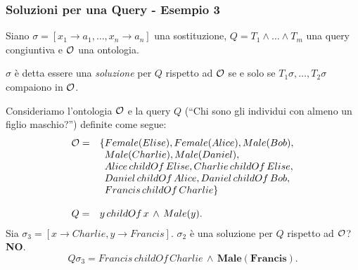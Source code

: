 \documentclass[8pt]{beamer}
\begin{document}
\begin{frame}
\frametitle{Soluzioni per una Query - Esempio 3}
Siano $\sigma=[x_1 \rightarrow a_1, \ldots, x_n \rightarrow a_n]$ una sostituzione,
$Q=T_1 \wedge \ldots \wedge T_m$ una query congiuntiva e $\mathcal{O}$ una ontologia.
\vspace{\baselineskip}

$\sigma$ \`e detta essere una \emph{soluzione} per $Q$ rispetto ad $\mathcal{O}$ se
e solo se $T_1\sigma, \ldots, T_2\sigma$ compaiono in $\mathcal{O}$. 
\vspace{\baselineskip}

Consideriamo l'ontologia $\mathcal{O}$ e la query $Q$ (``Chi sono gli individui con almeno un figlio maschio?'') definite come segue:
\[
\begin{array}{cl}
  \Ont  =  &  \{Female(Elise), Female(Alice), Male(Bob), \\
  &\phantom{\{}Male(Charlie), Male(Daniel), \\
  &\phantom{\{}Alice\,childOf\,Elise, Charlie\,childOf\,Elise, \\
  &\phantom{\{}Daniel\,childOf\,Alice, Daniel\,childOf\,Bob, \\
  &\phantom{\{}Francis\,childOf\,Charlie \}\\
  &\\
  Q = & y\,childOf\,x\,\wedge\,Male(y) .
 \end{array}
\]
Sia $\sigma_3=[x \rightarrow Charlie, y \rightarrow Francis]$. $\sigma_2$ \`e una soluzione per $Q$
rispetto ad $\mathcal{O}$? \textbf{NO}.
\[
 Q\sigma_3 = Francis\,childOf\,Charlie\,\wedge\,\mathbf{Male(Francis)} .
\]
\end{frame}
\end{document}
